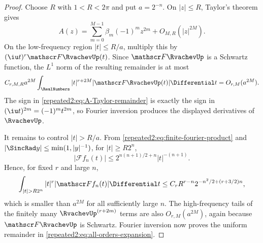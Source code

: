 \documentclass[11pt,oneside]{article}
\theoremstyle{definition}
\theoremstyle{remark}
\begin{document}
\begin{proof}
Choose $R$ with $1<R<2\pi$ and put $a=2^{-n}$.  On $|z|\le R$, Taylor's theorem gives
\begin{equation}
 A(z)=\sum_{m=0}^{M-1}\beta_m(-1)^m z^{2m}+O_{M,R}(|z|^{2M}).
 \label{repeated2:eq:A-Taylor-remainder}
\end{equation}
On the low-frequency region $|t|\le R/a$, multiply this by
$(\iu t)^r\mathscr F\RvachevUp(t)$.  Since $\mathscr F\RvachevUp$ is a Schwartz function, the
$L^1$ norm of the resulting remainder is at most
\[
 C_{r,M,R}a^{2M}\int_{\RealNumbers}|t|^{r+2M}|\mathscr F\RvachevUp(t)|\Differential t
 =O_{r,M}(a^{2M}).
\]
The sign in \eqref{repeated2:eq:A-Taylor-remainder} is exactly the sign in
$(\iu t)^{2m}=(-1)^mt^{2m}$, so Fourier inversion produces the displayed derivatives of
$\RvachevUp$.

It remains to control $|t|>R/a$.  From \eqref{repeated2:eq:finite-fourier-product} and
$|\SincRad y|\le\min(1,|y|^{-1})$, for $|t|\ge R2^n$,
\begin{equation}
 |\mathscr F f_n(t)|
 \le 2^{n(n+1)/2+n}|t|^{-(n+1)}.
 \label{repeated2:eq:finite-product-high-frequency}
\end{equation}
Hence, for fixed $r$ and large $n$,
\[
 \int_{|t|>R2^n}|t|^r|\mathscr F f_n(t)|\Differential t
 \le C_r R^{r-n}2^{-n^2/2+(r+3/2)n},
\]
which is smaller than $a^{2M}$ for all sufficiently large $n$.  The high-frequency tails
of the finitely many $\RvachevUp^{(r+2m)}$ terms are also $O_{r,M}(a^{2M})$, again because
$\mathscr F\RvachevUp$ is Schwartz.  Fourier inversion now proves the uniform remainder in
\eqref{repeated2:eq:all-orders-expansion}.
\end{proof}
\end{document}

